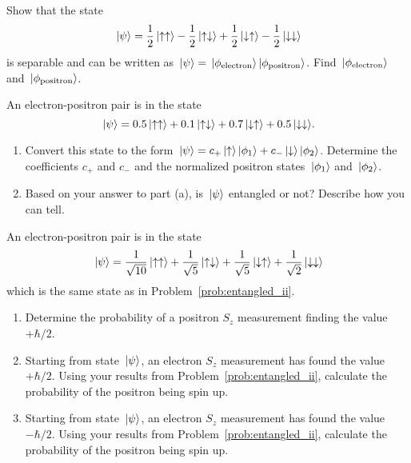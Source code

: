 \begin{problem}  
  Show that the state
  \[
  \,|\mbox{$\psi$}\rangle = \frac{1}{2}\,|\mbox{$\uparrow\uparrow$}\rangle
  -\frac{1}{2}\,|\mbox{$\uparrow\downarrow$}\rangle
  +\frac{1}{2}\,|\mbox{$\downarrow\uparrow$}\rangle
  -\frac{1}{2}\,|\mbox{$\downarrow\downarrow$}\rangle
  \]
  is separable and can be written as $\,|\mbox{$\psi$}\rangle =
  \,|\mbox{$\phi_\text{electron}$}\rangle \,|\mbox{$\phi_\text{positron}$}\rangle$.  Find
  $\,|\mbox{$\phi_\text{electron}$}\rangle$ and $\,|\mbox{$\phi_\text{positron}$}\rangle$.
\end{problem}


\begin{problem}  
  An electron-positron pair is in the state
  \[
  \,|\mbox{$\psi$}\rangle = 0.5\,|\mbox{$\uparrow\uparrow$}\rangle + 0.1\,|\mbox{$\uparrow\downarrow$}\rangle
  + 0.7\,|\mbox{$\downarrow\uparrow$}\rangle + 0.5\,|\mbox{$\downarrow\downarrow$}\rangle .
  \]
  \begin{enumerate}
  \item Convert this state to the form $\,|\mbox{$\psi$}\rangle =
    c_+\,|\mbox{$\uparrow$}\rangle\,|\mbox{$\phi_1$}\rangle + c_-\,|\mbox{$\downarrow$}\rangle\,|\mbox{$\phi_2$}\rangle$.
    Determine the coefficients $c_+$ and $c_-$ and the normalized
    positron states $\,|\mbox{$\phi_1$}\rangle$ and $\,|\mbox{$\phi_2$}\rangle$.
  \item Based on your answer to part (a), is $\,|\mbox{$\psi$}\rangle$ entangled or
    not?  Describe how you can tell.
  \end{enumerate}
\end{problem}

\newpage 

\begin{problem}
  An electron-positron pair is in the state
  \[
  \,|\mbox{$\psi$}\rangle = \frac{1}{\sqrt{10}}\,|\mbox{$\uparrow\uparrow$}\rangle
  +\frac{1}{\sqrt{5}}\,|\mbox{$\uparrow\downarrow$}\rangle +
  \frac{1}{\sqrt{5}}\,|\mbox{$\downarrow\uparrow$}\rangle +
  \frac{1}{\sqrt{2}}\,|\mbox{$\downarrow\downarrow$}\rangle
  \]
  which is the same state as in Problem~\ref{prob:entangled_ii}.
  \begin{enumerate}
  \item Determine the probability of a positron $S_z$ measurement
    finding the value $+\hbar/2$.
  \item Starting from state $\,|\mbox{$\psi$}\rangle$, an electron $S_z$
    measurement has found the value $+\hbar/2$.  Using your results
    from Problem~\ref{prob:entangled_ii}, calculate the probability of
    the positron being spin up.
  \item Starting from state $\,|\mbox{$\psi$}\rangle$, an electron $S_z$
    measurement has found the value $-\hbar/2$.  Using your results
    from Problem~\ref{prob:entangled_ii}, calculate the probability of
    the positron being spin up.
  \end{enumerate}
\end{problem}


